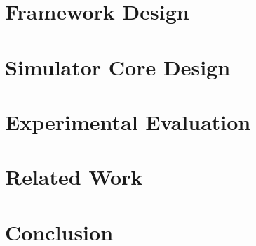 \documentclass[conference, 12pt]{IEEEtran}
\begin{document}
\section{Framework Design}

\section{Simulator Core Design}

\section{Experimental Evaluation}

\section{Related Work}



\cite{ref:ocelot-pact}

% 


\section{Conclusion}



\end{document}
